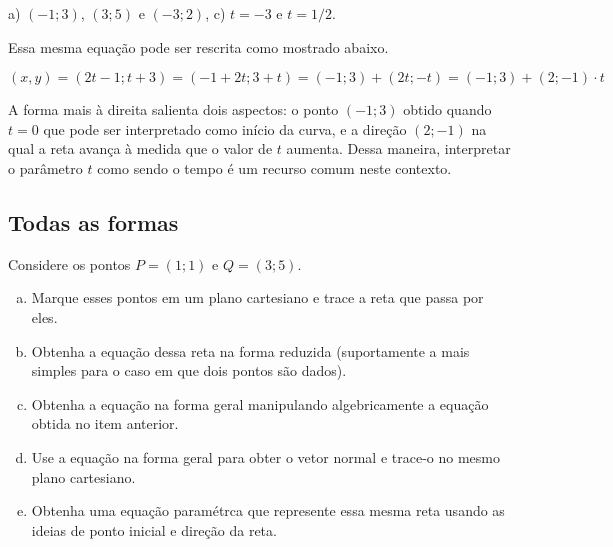 \documentclass[main.tex]{subfiles}
\begin{document}

\begin{gabarito}
	\begin{gabaritoQuestao}
		a) $(-1;3)$, $(3;5)$ e $(-3;2)$, c) $t=-3$ e $t=1/2$.
	\end{gabaritoQuestao}
\end{gabarito}

Essa mesma equação pode ser rescrita como mostrado abaixo.

$$ (x,y)=(2t-1;t+3)=(-1+2t;3+t)=(-1;3)+(2t;-t)=(-1;3)+(2;-1) \cdot t $$

A forma mais à direita salienta dois aspectos: o ponto $(-1;3)$ obtido quando $t=0$ que pode ser interpretado como início da curva, e a direção $(2;-1)$ na qual a reta avança à medida que o valor de $t$ aumenta. Dessa maneira, interpretar o parâmetro $t$ como sendo o tempo é um recurso comum neste contexto.

\subsection*{Todas as formas}

\begin{questao}
Considere os pontos $P=(1;1)$ e $Q=(3;5)$.
\begin{enumerate}[a)]
\item Marque esses pontos em um plano cartesiano e trace a reta que passa por eles.
\item Obtenha a equação dessa reta na forma reduzida (suportamente a mais simples para o caso em que dois pontos são dados).
\item Obtenha a equação na forma geral manipulando algebricamente a equação obtida no item anterior.
\item Use a equação na forma geral para obter o vetor normal e trace-o no mesmo plano cartesiano.
\item Obtenha uma equação paramétrca que represente essa mesma reta usando as ideias de ponto inicial e direção da reta.
\end{enumerate} 
\end{questao}

\end{document}
